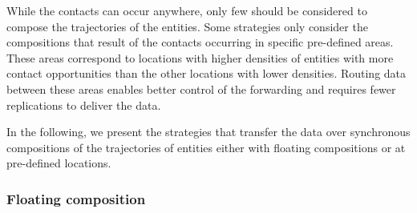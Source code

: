 While the contacts can occur anywhere, only few should be considered to compose the trajectories of the entities. Some strategies only consider the compositions that result of the contacts occurring in specific pre-defined areas. These areas correspond to locations with higher densities of entities with more contact opportunities than the other locations with lower densities. Routing data between these areas enables better control of the forwarding and requires fewer replications to deliver the data.

In the following, we present the strategies that transfer the data over synchronous compositions of the trajectories of entities either with floating compositions or at pre-defined locations.



\subsubsection{Floating composition}
\label{sec:indirect-sync-non-anchored}


